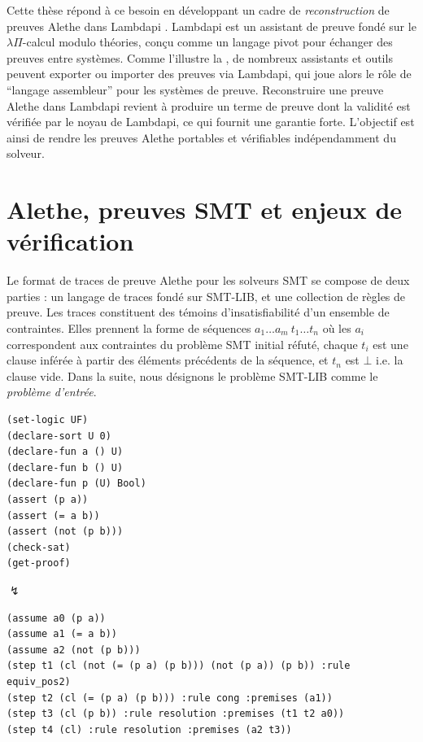 Cette thèse répond à ce besoin en développant un cadre de \emph{reconstruction} de preuves Alethe dans Lambdapi \cite{lambdapi}.
Lambdapi est un assistant de preuve fondé sur le $\lambda\Pi$-calcul modulo théories, conçu comme un langage pivot pour échanger des preuves entre systèmes.
Comme l'illustre la , de nombreux assistants et outils peuvent exporter ou importer des preuves via Lambdapi, qui joue alors le rôle de ``langage assembleur'' pour les systèmes de preuve.
Reconstruire une preuve Alethe dans Lambdapi revient à produire un terme de preuve dont la validité est vérifiée par le noyau de Lambdapi, ce qui fournit une garantie forte.
L'objectif est ainsi de rendre les preuves Alethe portables et vérifiables indépendamment du solveur.


\section*{Alethe, preuves SMT et enjeux de vérification}

Le format de traces de preuve Alethe \cite{alethespec} pour les solveurs SMT se compose de deux parties :
un langage de traces fondé sur SMT-LIB, et une collection de règles de preuve.
Les traces constituent des témoins d'insatisfiabilité d'un ensemble de contraintes.
Elles prennent la forme de séquences $a_1 \dots a_m~t_1 \dots t_n$ où les $a_i$ correspondent aux contraintes du problème SMT initial réfuté, chaque $t_i$ est une clause inférée à partir des éléments précédents de la séquence, et $t_n$ est $\bot$ i.e. la clause vide.
Dans la suite, nous désignons le problème SMT-LIB comme le \emph{problème d'entrée}.

\begin{lstlisting}[language=SMT]
(set-logic UF)
(declare-sort U 0)
(declare-fun a () U)
(declare-fun b () U)
(declare-fun p (U) Bool)
(assert (p a))
(assert (= a b))
(assert (not (p b)))
(check-sat)
(get-proof)
\end{lstlisting}

\begin{center}
$\lightning$
\end{center}

\begin{lstlisting}[language=SMT,caption={Un problème SMT et sa preuve Alethe trouvée par cvc5.},label={lst:fr-smtexampleinput-fol},nolol]
(assume a0 (p a))
(assume a1 (= a b))
(assume a2 (not (p b)))
(step t1 (cl (not (= (p a) (p b))) (not (p a)) (p b)) :rule equiv_pos2)
(step t2 (cl (= (p a) (p b))) :rule cong :premises (a1))
(step t3 (cl (p b)) :rule resolution :premises (t1 t2 a0))
(step t4 (cl) :rule resolution :premises (a2 t3))
\end{lstlisting}

